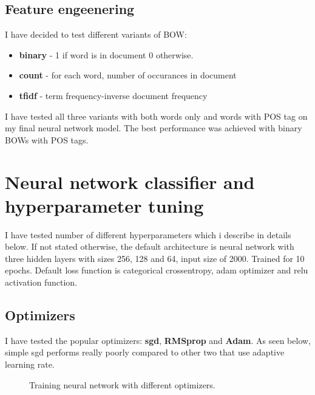 \documentclass{article}
\begin{document}
\subsection{Feature engeenering}
I have decided to test different variants of BOW:
\begin{itemize}
\item \textbf{binary} - 1 if word is in document 0 otherwise.
\item \textbf{count} - for each word, number of occurances in document
\item \textbf{tfidf} - term frequency-inverse document frequency
\end{itemize}
I have tested all three variants with both words only and words with POS tag on my final
neural network model. The best performance was achieved with binary BOWs with POS tags.


\section{Neural network classifier and hyperparameter tuning}
I have tested number of different hyperparameters which i describe
in details below. If not stated otherwise, the default architecture is neural network with three
hidden layers with sizes 256, 128 and 64, input size of 2000. Trained for 10 epochs. 
Default loss function is categorical crossentropy, adam optimizer and relu activation function.

\subsection{Optimizers}
I have tested the popular optimizers: \textbf{sgd}, \textbf{RMSprop} and \textbf{Adam}.
As seen below, simple sgd performs really poorly compared to other two that use adaptive learning rate.
\begin{figure}[h]	
	\begin{center}
        \caption{Training neural network with different optimizers.}
	\end{center}
\end{figure}
\end{document}
